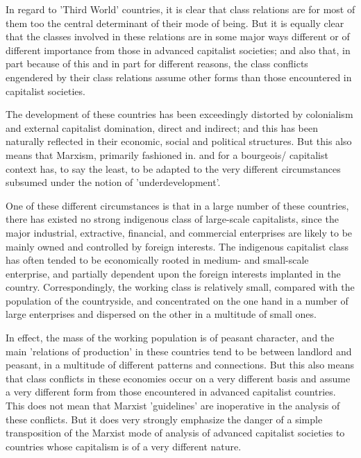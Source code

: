 In regard to 'Third World' countries, it is clear that class relations are for most of them too the central determinant of their mode of being. But it is equally clear that the classes involved in these relations are in some major ways different or of different importance from those in advanced capitalist societies; and also that, in part because of this and in part for different reasons, the class conflicts engendered by their class relations assume other forms than those encountered in capitalist societies.

The development of these countries has been exceedingly distorted by colonialism and external capitalist domination, direct and indirect; and this has been naturally reflected in their economic, social and political structures. But this also means that Marxism, primarily fashioned in. and for a bourgeois/ capitalist context has, to say the least, to be adapted to the very different circumstances subsumed under the notion of 'underdevelopment'.

One of these different circumstances is that in a large number of these countries, there has existed no strong indigenous class of large-scale capitalists, since the major industrial, extractive, financial, and commercial enterprises are likely to be mainly owned and controlled by foreign interests. The indigenous capitalist class has often tended to be economically rooted in medium- and small-scale enterprise, and partially dependent upon the foreign interests implanted in the country. Correspondingly, the working class is relatively small, compared with the population of the countryside, and concentrated on the one hand in a number of large enterprises and dispersed on the other in a multitude of small ones.

In effect, the mass of the working population is of peasant character, and the main 'relations of production' in these countries tend to be between landlord and peasant, in a multitude of different patterns and connections. But this also means that class conflicts in these economies occur on a very different basis and assume a very different form from those encountered in advanced capitalist countries. This does not mean that Marxist 'guidelines' are inoperative in the analysis of these conflicts. But it does very strongly emphasize the danger of a simple transposition of the Marxist mode of analysis of advanced capitalist societies to countries whose capitalism is of a very different nature.

